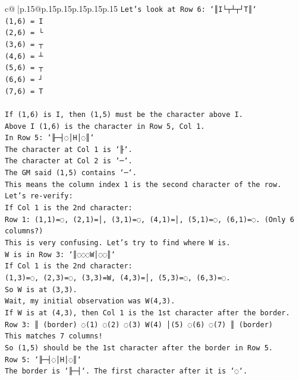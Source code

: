 \documentclass{article}
\begin{document}
{\begin{supertabular}{c@{$\;$}|p{.15\linewidth}@{}p{.15\linewidth}p{.15\linewidth}p{.15\linewidth}p{.15\linewidth}p{.15\linewidth}}
{{{\texttt{Let's look at Row 6: `║I└┬┴┬┘T║`} \\
\texttt{(1,6) = I} \\
\texttt{(2,6) = └} \\
\texttt{(3,6) = ┬} \\
\texttt{(4,6) = ┴} \\
\texttt{(5,6) = ┬} \\
\texttt{(6,6) = ┘} \\
\texttt{(7,6) = T} \\
\\ 
\texttt{If (1,6) is I, then (1,5) must be the character above I.} \\
\texttt{Above I (1,6) is the character in Row 5, Col 1.} \\
\texttt{In Row 5: `╟─┤◌│H│◌║`} \\
\texttt{The character at Col 1 is `╟`.} \\
\texttt{The character at Col 2 is `─`.} \\
\texttt{The GM said (1,5) contains `─`.} \\
\texttt{This means the column index 1 is the second character of the row.} \\
\texttt{Let's re{-}verify:} \\
\texttt{If Col 1 is the 2nd character:} \\
\texttt{Row 1: (1,1)=◌, (2,1)=│, (3,1)=◌, (4,1)=│, (5,1)=◌, (6,1)=◌. (Only 6 columns?)} \\
\texttt{This is very confusing. Let's try to find where W is.} \\
\texttt{W is in Row 3: `║◌◌◌W│◌◌║`} \\
\texttt{If Col 1 is the 2nd character:} \\
\texttt{(1,3)=◌, (2,3)=◌, (3,3)=W, (4,3)=│, (5,3)=◌, (6,3)=◌.} \\
\texttt{So W is at (3,3).} \\
\texttt{Wait, my initial observation was W(4,3).} \\
\texttt{If W is at (4,3), then Col 1 is the 1st character after the border.} \\
\texttt{Row 3: ║ (border) ◌(1) ◌(2) ◌(3) W(4) │(5) ◌(6) ◌(7) ║ (border)} \\
\texttt{This matches 7 columns!} \\
\texttt{So (1,5) should be the 1st character after the border in Row 5.} \\
\texttt{Row 5: `╟─┤◌│H│◌║`} \\
\texttt{The border is `╟─┤`. The first character after it is `◌`.} \\
}}}
\end{supertabular}}
\end{document}
